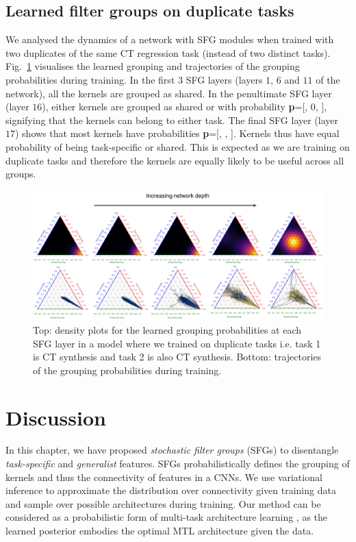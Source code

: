 \subsection{Learned filter groups on duplicate tasks}
We analysed the dynamics of a network with SFG modules when trained with two duplicates of the same CT regression task (instead of two distinct tasks). Fig.~\ref{fig:duplicate} visualises the learned grouping and trajectories of the grouping probabilities during training. In the first $3$ SFG layers (layers $1$, $6$ and $11$ of the network), all the kernels are grouped as shared. In the penultimate SFG layer (layer $16$), either kernels are grouped as shared or with probability \textbf{p}=[, 0, ], signifying that the kernels can belong to either task. The final SFG layer (layer $17$) shows that most kernels have probabilities \textbf{p}=[, , ]. Kernels thus have equal probability of being task-specific or shared. This is expected as we are training on duplicate tasks and therefore the kernels are equally likely to be useful across all groups.

\begin{figure}[ht]
	\centering
	\includegraphics[width=1.0\textwidth]{chapter_6/figures_supp/final_dup.pdf}
	\caption{\footnotesize Top: density plots for the learned grouping probabilities at each SFG layer in a model where we trained on duplicate tasks i.e. task 1 is CT synthesis and task 2 is also CT synthesis. Bottom: trajectories of the grouping probabilities during training.}
	\label{fig:duplicate}
\end{figure}


\section{Discussion}
In this chapter, we have proposed \emph{stochastic filter groups} (SFGs) to disentangle \emph{task-specific} and \emph{generalist} features. SFGs probabilistically defines the grouping of kernels and thus the connectivity of features in a CNNs. We use variational inference to approximate the distribution over connectivity given training data and sample over possible architectures during training. Our method can be considered as a probabilistic form of multi-task architecture learning \cite{liang2018evolutionary}, as the learned posterior embodies the optimal MTL architecture given the data.

